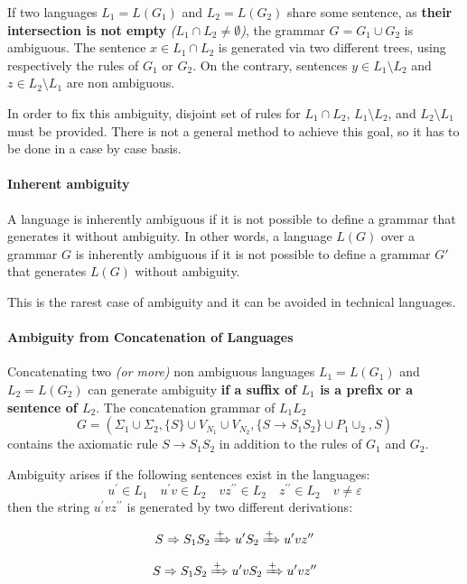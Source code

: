 \documentclass[english]{article}
\begin{document}
If two languages \(L_1 = L(G_1)\) and \(L_2 = L(G_2)\) share some sentence, as \textbf{their intersection is not empty} \textit{(\(L_1 \cap L_2 \neq \emptyset\))}, the grammar \(G = G_1 \cup G_2\) is ambiguous.
The sentence \(x \in L_1 \cap L_2\) is generated via two different trees, using respectively the rules of \(G_1\) or \(G_2\).
On the contrary, sentences \(y \in L_1 \setminus L_2\) and \(z \in L_2 \setminus L_1\) are non ambiguous.

In order to fix this ambiguity, disjoint set of rules for \(L_1 \cap L_2\), \(L_1 \setminus L_2\), and \(L_2 \setminus L_1\) must be provided.
There is not a general method to achieve this goal, so it has to be done in a case by case basis.

\paragraph{Inherent ambiguity}

A language is inherently ambiguous if it is not possible to define a grammar that generates it without ambiguity.
In other words, a language \(L(G)\) over a grammar \(G\) is inherently ambiguous if it is not possible to define a grammar \(G'\) that generates \(L(G)\) without ambiguity.

This is the rarest case of ambiguity and it can be avoided in technical languages.

\paragraph{Ambiguity from Concatenation of Languages}

Concatenating two \textit{(or more)} non ambiguous languages \(L_1 = L(G_1)\) and \(L_2 = L(G_2)\) can generate ambiguity \textbf{if a suffix of \(L_1\) is a prefix or a sentence of \(L_2\)}.
The concatenation grammar  of \(L_1 L_2\)
\[G = \left(\Sigma_1 \cup \Sigma_2, \{S\} \cup V_{N_1} \cup V_{N_2}, \{S \rightarrow S_1 S_2\} \cup P_1 \cup _2, S\right)\]
contains the axiomatic rule \(S \rightarrow S_1 S_2\) in addition to the rules of \(G_1\) and \(G_2\).

Ambiguity arises if the following sentences exist in the languages:
\[ u^\prime \in L_1 \quad u^\prime v \in L_2 \quad v z^{\prime \prime} \in L_2 \quad z^{\prime \prime} \in L_2 \quad v \neq \varepsilon \]
then the string \(u^\prime v z^{\prime \prime}\) is generated by two different derivations:

\[S \Rightarrow S_1 S_2 \xRightarrow{+} u^\prime S_2 \xRightarrow{+} u^\prime v z^{\prime \prime}\]
\[S \Rightarrow S_1 S_2 \xRightarrow{+} u^\prime v S_2 \xRightarrow{+} u^\prime v z^{\prime \prime}\]
\end{document}
